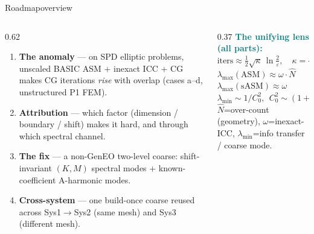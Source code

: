 \documentclass[aspectratio=169,9pt]{beamer}
\begin{document}
\begin{frame}{Roadmap}{overview}
  \begin{columns}[T]
  \begin{column}{0.62\linewidth}
  \begin{enumerate}\setlength\itemsep{0.45em}
   \item[\textcolor{amber}{\textbf{I}}] \textbf{The anomaly} — on SPD elliptic problems, unscaled BASIC ASM + inexact ICC + CG makes CG iterations \emph{rise} with overlap (cases a–d, unstructured P1 FEM).
   \item[\textcolor{amber}{\textbf{II}}] \textbf{Attribution} — which factor (dimension / boundary / shift) makes it hard, and through which spectral channel.
   \item[\textcolor{amber}{\textbf{III}}] \textbf{The fix} — a non-GenEO two-level coarse: shift-invariant $(K,M)$ spectral modes + known-coefficient A-harmonic modes.
   \item[\textcolor{amber}{\textbf{IV}}] \textbf{Cross-system} — one build-once coarse reused across Sys1$\to$Sys2 (same mesh) and Sys3 (different mesh).
  \end{enumerate}
  \end{column}
  \begin{column}{0.37\linewidth}\footnotesize
   \textcolor{teal}{\textbf{The unifying lens (all parts):}}\\[3pt]
   $\displaystyle\text{iters}\approx\tfrac12\sqrt{\kappa}\,\ln\tfrac2\varepsilon,\quad \kappa=\frac{\lambda_{\max}}{\lambda_{\min}}$\\[5pt]
   $\lambda_{\max}(\text{ASM})\approx\omega\cdot\hat N$\\
   $\lambda_{\max}(\text{sASM})\approx\omega$\\
   $\lambda_{\min}\sim 1/C_0^2,\ \ C_0^2\sim(1{+}H/\delta)$\\[5pt]
   \textcolor{muted}{$\hat N$=over-count (geometry), $\omega$=inexact-ICC, $\lambda_{\min}$=info transfer / coarse mode.}
  \end{column}
  \end{columns}
\end{frame}
\end{document}
